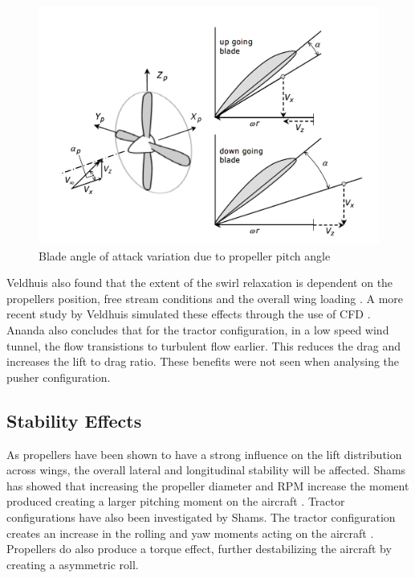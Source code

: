 \begin{figure}[H]
  \centering
  \includegraphics[width=0.8\linewidth]{03_LiteratureReview/Figs/anlges.png}
  \caption{Blade angle of attack variation due to propeller pitch angle \cite{Veldhuis2004}}
  \label{fig:propangles}
\end{figure}

Veldhuis also found that the extent of the swirl relaxation is dependent on the propellers position, free stream conditions and the overall wing loading \cite{Veldhuis2004}. A more recent study by Veldhuis simulated these effects through the use of CFD \cite{Veldhuis2016}. Ananda also concludes that for the tractor configuration, in a low speed wind tunnel, the flow transistions to turbulent flow earlier. This reduces the drag and increases the lift to drag ratio. These benefits were not seen when analysing the pusher configuration.


















\subsection{Stability Effects}
As propellers have been shown to have a strong influence on the lift distribution across wings, the overall lateral and longitudinal stability will be affected. Shams has showed that increasing the propeller diameter and RPM increase the moment produced creating a larger pitching moment on the aircraft \cite{Shams2020}. Tractor configurations have also been investigated by Shams. The tractor configuration creates an increase in the rolling and yaw moments acting on the aircraft \cite{Shams2020}. Propellers do also produce a torque effect, further destabilizing the aircraft by creating a asymmetric roll. 


